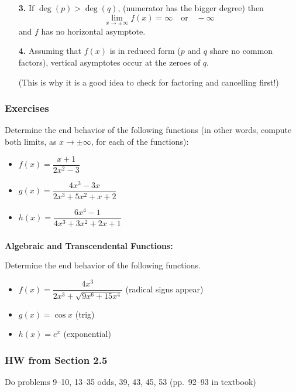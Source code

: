 \documentclass[14pt]{beamer}
\begin{document}
\begin{frame}
\begin{itemize}
\small
\item[{\bf 3.}] If $\deg(p)>\deg(q)$, \alert{(numerator has the bigger degree)} then 
\[\lim_{x\to\pm\infty}f(x)=\infty\quad\text{or}\quad -\infty\] 
and $f$ has no horizontal asymptote.

\vspace{2pc}
\item[{\bf 4.}] Assuming that $f(x)$ is in \alert{reduced form} ($p$ and $q$ share no common factors), vertical asymptotes occur at the zeroes of $q$.  

\vspace{1pc}
(This is why it is a good idea to check for factoring and cancelling first!)
\end{itemize}
\end{frame}

\begin{frame}
\frametitle{Exercises}
\small
Determine the end behavior of the following functions (in other words, compute both limits, as $x\to\pm\infty$, for each of the functions):
\begin{itemize}
\item $f(x)=\dfrac{x+1}{2x^2-3}$
\item $g(x)=\dfrac{4x^3-3x}{2x^3+5x^2+x+2}$
\item $h(x)=\dfrac{6x^4-1}{4x^3+3x^2+2x+1}$
\end{itemize}
\end{frame}


\begin{frame}
\frametitle{}
\small
{\bf Algebraic and Transcendental Functions:}

Determine the end behavior of the following functions.
\begin{itemize}
\item $f(x) = \dfrac{4x^3}{2x^3+\sqrt{9x^6+15x^4}}$ (radical signs appear)

\vspace{1pc}
\item $g(x)=\cos x$ (trig)

\vspace{1pc}
\item $h(x)=e^x$ (exponential)
\end{itemize}
\end{frame}

\begin{frame}
\frametitle{HW from Section 2.5}
Do problems 9--10, 13--35 odds, 39, 43, 45, 53 (pp.\ 92--93 in textbook)
\end{frame}

\begin{comment}
\end{comment}
\end{document}
